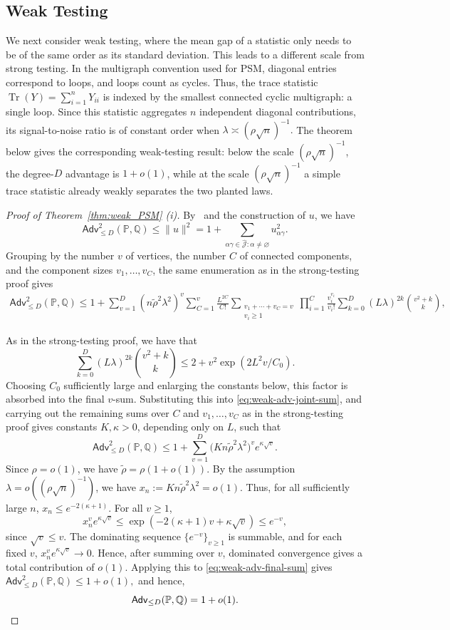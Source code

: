 \documentclass[11pt, letterpaper]{article}
\numberwithin{equation}{section}
\newcommand{\Adv}{\mathsf{Adv}}
\newcommand{\PP}{\mathbb{P}}
\newcommand{\QQ}{\mathbb{Q}}
\newcommand{\goodJ}{\widehat{\mathcal{J}}}
\begin{document}
\subsection{Weak Testing}
We next consider weak testing, where the mean gap of a statistic only needs to be of the same order as its standard deviation. This leads to a different scale from strong testing. In the multigraph convention used for PSM, diagonal entries correspond to loops, and loops count as cycles. Thus, the trace statistic $\operatorname{Tr}(Y)=\sum_{i=1}^n Y_{ii}$ is indexed by the smallest connected cyclic multigraph: a single loop. Since this statistic aggregates $n$ independent diagonal contributions, its signal-to-noise ratio is of constant order when $
\lambda\asymp(\rho\sqrt n)^{-1}.$
The theorem below gives the corresponding weak-testing result: below the scale $(\rho\sqrt n)^{-1}$, the degree-$D$ advantage is $1+o(1)$, while at the scale $(\rho\sqrt n)^{-1}$ a simple trace statistic already weakly separates the two planted laws.
\thmPSMweak*
\begin{proof}[Proof of Theorem~\ref{thm:weak_PSM} \textnormal{(i)}]
By~ and the construction of $u$, we have
\[
\Adv_{\le D}^2(\PP,\QQ)
\le \|u\|^2
=1+\sum_{\alpha\gamma\in\goodJ:\alpha\neq\varnothing}u_{\alpha\gamma}^2 .
\]
Grouping by the number $v$ of vertices, the number $C$ of connected components, and the component sizes $v_1,\dots,v_C$, the same enumeration as in the strong-testing proof gives
%
\begin{align}
\Adv_{\le D}^2(\PP,\QQ)\le 1+\sum_{v=1}^D ({ n}\tilde\rho^2\lambda^2)^{v}
\sum_{C=1}^v \frac{L^{2C}}{C!}
\sum_{\substack{v_1+\cdots+v_C=v\\ v_i\ge1}}
\prod_{i=1}^C \frac{v_i^{ v_i}}{v_i!}
\sum_{k=0}^D (L\lambda)^{2k}\binom{ v^2+k}{k},
\label{eq:weak-adv-joint-sum}
\end{align}
%

As in the strong-testing proof, we have that
\[
 \sum_{k=0}^D (L\lambda)^{2k}\binom{v^2+k}{k} \leq 2+{v^2}\exp(2L^2v/C_0).
\]
Choosing $C_0$ sufficiently large and enlarging the constants below, this factor is absorbed into the final $v$-sum. Substituting this into \eqref{eq:weak-adv-joint-sum}, and carrying out the remaining sums over $C$ and $v_1,\dots,v_C$ as in the strong-testing proof gives constants $K,\kappa>0$, depending only on $L$, such that
\begin{equation}\label{eq:weak-adv-final-sum}
\Adv_{\le D}^2(\PP,\QQ)
\le
1+\sum_{v=1}^D \big(Kn\tilde\rho^2\lambda^2\big)^v e^{\kappa\sqrt v}.
\end{equation}
Since $\rho=o(1)$, we have $\tilde\rho=\rho(1+o(1))$. By the assumption
$\lambda=o((\rho\sqrt n)^{-1})$, we have $
x_n:=Kn\tilde\rho^2\lambda^2=o(1).$
Thus, for all sufficiently large $n$, $x_n\le e^{-2(\kappa+1)}$. For all $v\ge1$,
\[
x_n^v e^{\kappa\sqrt v}
\le
\exp(-2(\kappa+1)v+\kappa\sqrt v)
\le
e^{-v},
\]
since $\sqrt v\le v$.
The dominating sequence $\{e^{- v}\}_{v\ge1}$ is summable, and for each fixed $v$,
$x_n^v e^{\kappa\sqrt v}\to0.$ Hence, after summing over $v$, dominated convergence gives a total contribution of $o(1)$. Applying this to \eqref{eq:weak-adv-final-sum} gives $\Adv_{\le D}^2(\PP,\QQ)\le1+o(1),$
and hence, \[\Adv_{\le D}(\PP,\QQ)=1+o(1). \qedhere\]
\end{proof}
\end{document}
